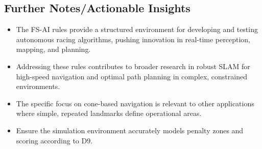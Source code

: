 \subsection{Further Notes/Actionable Insights}\label{subsec:further-notes/actionable-insights}
\begin{itemize}
    \item The FS-AI rules provide a structured environment for developing and testing autonomous racing algorithms, pushing innovation in real-time perception, mapping, and planning.
    \item Addressing these rules contributes to broader research in robust SLAM for high-speed navigation and optimal path planning in complex, constrained environments.
    \item The specific focus on cone-based navigation is relevant to other applications where simple, repeated landmarks define operational areas.
    \item Ensure the simulation environment accurately models penalty zones and scoring according to D9.
\end{itemize}